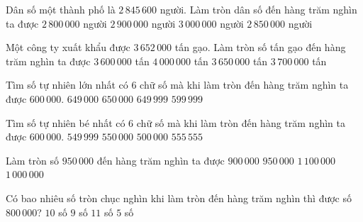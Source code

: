 \begin{ex} %
Dân số một thành phố là $2\,845\,600$ người. Làm tròn dân số đến hàng trăm nghìn ta được
\choice
{\True $2\,800\,000$ người}
{$2\,900\,000$ người}
{$3\,000\,000$ người}
{$2\,850\,000$ người}
\end{ex}

\begin{ex} %
Một công ty xuất khẩu được $3\,652\,000$ tấn gạo. Làm tròn số tấn gạo đến hàng trăm nghìn ta được
\choice
{$3\,600\,000$ tấn}
{$4\,000\,000$ tấn}
{$3\,650\,000$ tấn}
{\True $3\,700\,000$ tấn}
\end{ex}

\begin{ex} %
Tìm số tự nhiên lớn nhất có 6 chữ số mà khi làm tròn đến hàng trăm nghìn ta được $600\,000$.
\choice
{$649\,000$}
{$650\,000$}
{\True $649\,999$}
{$599\,999$}
\end{ex}

\begin{ex} %
Tìm số tự nhiên bé nhất có 6 chữ số mà khi làm tròn đến hàng trăm nghìn ta được $600\,000$.
\choice
{$549\,999$}
{\True $550\,000$}
{$500\,000$}
{$555\,555$}
\end{ex}

\begin{ex} %
Làm tròn số $950\,000$ đến hàng trăm nghìn ta được
\choice
{$900\,000$}
{$950\,000$}
{$1\,100\,000$}
{\True $1\,000\,000$}
\end{ex}

\begin{ex} %
Có bao nhiêu số tròn chục nghìn khi làm tròn đến hàng trăm nghìn thì được số $800\,000$?
\choice
{\True $10$ số}
{$9$ số}
{$11$ số}
{$5$ số}
\end{ex}

